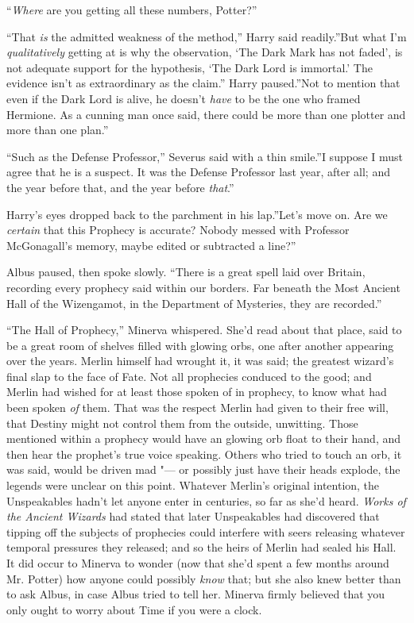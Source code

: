 ``\emph{Where} are you getting all these numbers, Potter?''

``That \emph{is} the admitted weakness of the method,'' Harry said
readily.''But what I'm \emph{qualitatively} getting at is why the
observation, `The Dark Mark has not faded', is not adequate support for
the hypothesis, `The Dark Lord is immortal.' The evidence isn't as
extraordinary as the claim.'' Harry paused.''Not to mention that even if
the Dark Lord is alive, he doesn't \emph{have} to be the one who framed
Hermione. As a cunning man once said, there could be more than one
plotter and more than one plan.''

``Such as the Defense Professor,'' Severus said with a thin smile.''I
suppose I must agree that he is a suspect. It was the Defense Professor
last year, after all; and the year before that, and the year before
\emph{that}.''

Harry's eyes dropped back to the parchment in his lap.''Let's move on.
Are we \emph{certain} that this Prophecy is accurate? Nobody messed with
Professor McGonagall's memory, maybe edited or subtracted a line?''

Albus paused, then spoke slowly. ``There is a great spell laid over
Britain, recording every prophecy said within our borders. Far beneath
the Most Ancient Hall of the Wizengamot, in the Department of Mysteries,
they are recorded.''

``The Hall of Prophecy,'' Minerva whispered. She'd read about that
place, said to be a great room of shelves filled with glowing orbs, one
after another appearing over the years. Merlin himself had wrought it,
it was said; the greatest wizard's final slap to the face of Fate. Not
all prophecies conduced to the good; and Merlin had wished for at least
those spoken of in prophecy, to know what had been spoken \emph{of}
them. That was the respect Merlin had given to their free will, that
Destiny might not control them from the outside, unwitting. Those
mentioned within a prophecy would have an glowing orb float to their
hand, and then hear the prophet's true voice speaking. Others who tried
to touch an orb, it was said, would be driven mad "--- or possibly just
have their heads explode, the legends were unclear on this point.
Whatever Merlin's original intention, the Unspeakables hadn't let anyone
enter in centuries, so far as she'd heard. \emph{Works of the Ancient
Wizards} had stated that later Unspeakables had discovered that tipping
off the subjects of prophecies could interfere with seers releasing
whatever temporal pressures they released; and so the heirs of Merlin
had sealed his Hall. It did occur to Minerva to wonder (now that she'd
spent a few months around Mr. Potter) how anyone could possibly
\emph{know} that; but she also knew better than to ask Albus, in case
Albus tried to tell her. Minerva firmly believed that you only ought to
worry about Time if you were a clock.

